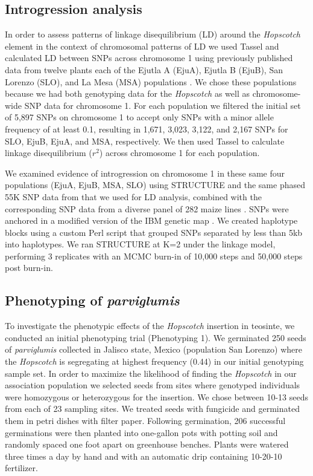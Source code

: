 \documentclass[11pt]{article}
\begin{document}
\begin{linenumbers}
\begin{flushleft}
\subsection*{Introgression analysis}

In order to assess patterns of linkage disequilibrium (LD) around the \emph{Hopscotch} element in the context of chromosomal patterns of LD we used Tassel \citep{Bradbury2007} and calculated LD between SNPs across chromosome 1 using previously published data from twelve plants each of the Ejutla A (EjuA), Ejutla B (EjuB), San Lorenzo (SLO), and La Mesa (MSA) populations \citep{Pyhajarvi2013}. We chose these populations because we had both genotyping data for the \emph{Hopscotch} as well as chromosome-wide SNP data for chromosome 1. For each population we filtered the initial set of 5,897 SNPs on chromosome 1 to accept only SNPs with a minor allele frequency of at least 0.1, resulting in 1,671, 3,023, 3,122, and 2,167 SNPs for SLO, EjuB, EjuA, and MSA, respectively. We then used Tassel \citep{Bradbury2007} to calculate linkage disequilibrium ($r^{2}$) across chromosome 1 for each population. 

We examined evidence of introgression on chromosome 1 in these same four populations (EjuA, EjuB, MSA, SLO) using STRUCTURE \citep{Falush2003} and the same phased 55K SNP data from \citep{Pyhajarvi2013} that we used for LD analysis, combined with the corresponding SNP data from a diverse panel of 282 maize lines \citep{Cook2012}. SNPs were anchored in a modified version of the IBM genetic map \citep{Gerke2013}. We created haplotype blocks using a custom Perl script that grouped SNPs separated by less than 5kb into haplotypes. We ran STRUCTURE at K=2 under the linkage model, performing 3 replicates with an MCMC burn-in of 10,000 steps and 50,000 steps post burn-in.

\subsection*{Phenotyping of \emph{parviglumis}}

To investigate the phenotypic effects of the \emph{Hopscotch} insertion in teosinte, we conducted an initial phenotyping trial (Phenotyping 1). We germinated 250 seeds of \emph{parviglumis} collected in Jalisco state, Mexico (population San Lorenzo) \citep{Hufford2010} where the \emph{Hopscotch} is segregating at highest frequency (0.44) in our initial genotyping sample set. In order to maximize the likelihood of finding the \emph{Hopscotch} in our association population we selected seeds from sites where genotyped individuals were homozygous or heterozygous for the insertion. We chose between 10-13 seeds from each of 23 sampling sites. We treated seeds with fungicide and germinated them in petri dishes with filter paper. Following germination, 206 successful germinations were then planted into one-gallon pots with potting soil and randomly spaced one foot apart on greenhouse benches. Plants were watered three times a day by hand and with an automatic drip containing 10-20-10 fertilizer. 


\end{flushleft}
\end{linenumbers}
\end{document}

